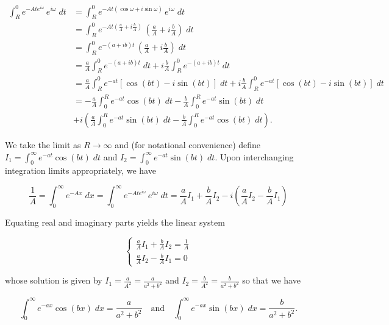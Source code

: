 \begin{solution}
    \begin{align*}
        \int_{R}^{0} {e^{-Ate^{i\omega}} \, e^{i\omega} \; dt}
          &= \int_{R}^{0} {e^{-At(\cos{\omega} + i \sin{\omega})} \, e^{i\omega} \; dt} \\
          &= \int_{R}^{0} {e^{-At\left(\frac{a}{A} + i \frac{b}{A}\right)} \, \left(\frac{a}{A} + i \frac{b}{A}\right) \; dt} \\
          &= \int_{R}^{0} {e^{-(a + ib) t} \, \left(\frac{a}{A} + i \frac{b}{A}\right) \; dt} \\
          &= \frac{a}{A} \int_{R}^{0} {e^{-(a + ib) t} \; dt} + i \frac{b}{A} \int_{R}^{0} {e^{-(a + ib) t} \; dt} \\
          &= \frac{a}{A} \int_{R}^{0} {e^{-at} \left[\cos{(bt)} - i \sin{(bt)} \right] \; dt} + i \frac{b}{A} \int_{R}^{0} {e^{-at} \left[\cos{(bt)} - i \sin{(bt)} \right] \; dt} \\
          &= -\frac{a}{A} \int_{0}^{R} {e^{-at} \cos{(bt)} \; dt}
             - \frac{b}{A} \int_{0}^{R} {e^{-at} \sin{(bt)} \; dt} \\
             &+ i \left(
                   \frac{a}{A} \int_{0}^{R} {e^{-at} \sin{(bt)} \; dt}
                 - \frac{b}{A} \int_{0}^{R} {e^{-at} \cos{(bt)} \; dt}
                 \right).
    \end{align*}

    We take the limit as $R \to \infty$ and (for notational convenience) define 
    $I_1 = \int_0^{\infty} e^{-at} \cos{(bt)} \; dt$ and $I_2 = \int_0^{\infty} e^{-at} \sin{(bt)} \; dt$. Upon 
    interchanging integration limits appropriately, we have

    $$
    \frac{1}{A} = \int_0^{\infty} e^{-Ax} \; dx 
                = \int_{0}^{\infty} {e^{-At e^{i\omega}} \, e^{i\omega} \; dt} 
                = \frac{a}{A} I_1 + \frac{b}{A} I_2 - i\left( \frac{a}{A} I_2 - \frac{b}{A} I_1 \right)
    $$

    Equating real and imaginary parts yields the linear system

    $$
    \begin{cases}
        \frac{a}{A} I_1 + \frac{b}{A} I_2 = \frac{1}{A} \\
        \frac{a}{A} I_2 - \frac{b}{A} I_1 = 0
    \end{cases}
    $$

    whose solution is given by $I_1 = \frac{a}{A^2} = \frac{a}{a^2 + b^2}$ and $I_2 = \frac{b}{A^2} = \frac{b}{a^2 + b^2}$ so that we have

    $$
    \int_0^{\infty} e^{-ax} \cos{(bx)} \; dx = \frac{a}{a^2 + b^2} \quad \text{and} \quad \int_0^{\infty} e^{-ax} \sin{(bx)} \; dx = \frac{b}{a^2 + b^2}.
    $$
    \ \\
\end{solution}